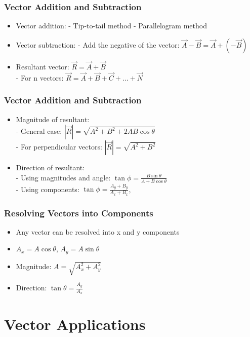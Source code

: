 \documentclass{beamer}
\begin{document}
\begin{frame}
\frametitle{Vector Addition and Subtraction}
\begin{itemize}
    \item Vector addition:
- Tip-to-tail method
- Parallelogram method

\item Vector subtraction:
- Add the negative of the vector: $\vec{A} - \vec{B} = \vec{A} + (-\vec{B})$

\item Resultant vector: $\vec{R} = \vec{A} + \vec{B}$
 \\
- For n vectors: $\vec{R} = \vec{A} + \vec{B} + \vec{C} + ... + \vec{N}$
\end{itemize}
\end{frame}

\begin{frame}
\frametitle{Vector Addition and Subtraction}
\begin{itemize}
\item Magnitude of resultant:\\
- General case: $|\vec{R}| = \sqrt{A^2 + B^2 + 2AB\cos\theta}$\\
- For perpendicular vectors: $|\vec{R}| = \sqrt{A^2 + B^2}$

\item Direction of resultant:\\
- Using magnitudes and angle: $\tan\phi = \frac{B\sin\theta}{A + B\cos\theta}$\\
- Using components: $\tan\phi = \frac{A_y + B_y}{A_x + B_x}$, 

\end{itemize}
\end{frame}

\begin{frame}
\frametitle{Resolving Vectors into Components}
\begin{itemize}
    \item Any vector can be resolved into x and y components
    \item $A_x = A\cos\theta$, $A_y = A\sin\theta$
    \item Magnitude: $A = \sqrt{A_x^2 + A_y^2}$
    \item Direction: $\tan\theta = \frac{A_y}{A_x}$
\end{itemize}
\end{frame}

\section{Vector Applications}
\end{document}

